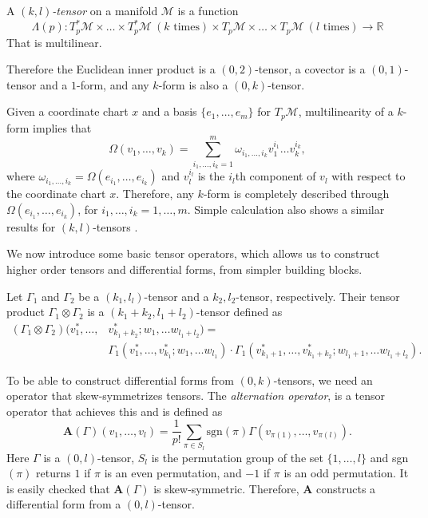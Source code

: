 \begin{definition}
A \emph{$(k,l)$-tensor} on a manifold $\mathcal M$ is a function 
\[
	\Lambda(p):T_p^*\mathcal M \times \dots \times T_p^*\mathcal M \ (k \text{ times}) \times T_p\mathcal M \times \dots \times T_p\mathcal M \ (l \text{ times}) \to \mathbb R
\]
That is multilinear.
\end{definition}
Therefore the Euclidean inner product is a $(0,2)$-tensor, a covector is a $(0,1)$-tensor and a $1$-form, and any $k$-form is also a $(0,k)$-tensor. 

Given a coordinate chart $x$ and a basis $\{ e_1,\dots,e_m\}$ for $T_{p}\mathcal M$, multilinearity of a $k$-form implies that
\begin{equation}
	\Omega(v_1,\dots,v_k) = \sum_{i_1,\dots,i_k =1}^{m} \omega_{i_1,\dots,i_k} v_{1}^{i_1}\dots v_{k}^{i_k}, 
\end{equation}
where $\omega_{i_1,\dots,i_k} = \Omega(e_{i_1},\dots,e_{i_k})$ and $v_{l}^{i_l}$ is the $i_l$th component of $v_l$ with respect to the coordinate chart $x$. Therefore, any $k$-form is completely described through $\Omega(e_{i_1},\dots,e_{i_k})$, for $i_1,\dots,i_k=1,\dots,m$. Simple calculation also shows a similar results for $(k,l)$-tensors \cite{Wald:106274}.

We now introduce some basic tensor operators, which allows us to construct higher order tensors and differential forms, from simpler building blocks.
\begin{definition}
	Let $\Gamma_1$ and $\Gamma_2$ be a $(k_1,l_l)$-tensor and a $k_2,l_2$-tensor, respectively. Their tensor product $\Gamma_1\otimes \Gamma_2$ is a $(k_1+k_2,l_1+l_2)$-tensor defined as
\[
	\begin{aligned}
	(\Gamma_1\otimes \Gamma_2)(v^*_1,\dots,&v^*_{k_1+k_2};w_1,\dots w_{l_1+l_2}) = \\
		&\Gamma_1(v^*_1,\dots,v^*_{k_1};w_1,\dots w_{l_1})\cdot \Gamma_1(v^*_{k_1+1},\dots,v^*_{k_1+k_2};w_{l_1+1},\dots w_{l_1+l_2}).
	\end{aligned}
\]
\end{definition}
To be able to construct differential forms from $(0,k)$-tensors, we need an operator that skew-symmetrizes tensors. The \emph{alternation operator}, is a tensor operator that achieves this and is defined as
\begin{equation}
	\textbf{A}(\Gamma)(v_1,\dots,v_l) = \frac{1}{p!} \sum_{\pi \in S_l} \text{sgn}(\pi) \Gamma(v_{\pi(1)},\dots,v_{\pi(l)}).
\end{equation}
Here $\Gamma$ is a $(0,l)$-tensor, $S_l$ is the permutation group of the set $\{1,\dots,l\}$ and sgn$(\pi)$ returns $1$ if $\pi$ is an even permutation, and $-1$ if $\pi$ is an odd permutation. It is easily checked that $\textbf{A}(\Gamma)$ is skew-symmetric. Therefore, $\textbf{A}$ constructs a differential form from a $(0,l)$-tensor.

